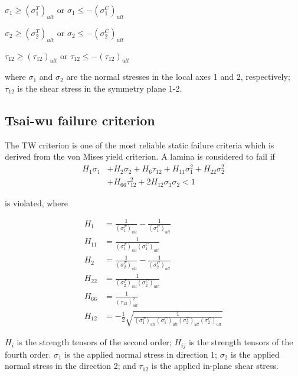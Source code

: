$\sigma_1 \geq (\sigma _1^{T})_{ult} $ or $\sigma_1 \leq -(\sigma _1^{C})_{ult} $

$\sigma_2 \geq (\sigma _2^{T})_{ult} $ or $\sigma_2 \leq -(\sigma _2^{C})_{ult} $

$\tau_{12} \geq (\tau_{12})_{ult} $  or $\tau_{12} \leq -(\tau_{12})_{ult} $

where $\sigma_1$ and $\sigma_2$ are the normal stresses in the local axes 1 and 2, respectively;
$\tau_{12}$ is the shear stress in the symmetry plane 1-2.

\subsection{Tsai-wu failure criterion}
The TW criterion is one of the most reliable static failure criteria which is derived from the von
Mises yield criterion.  
A lamina is considered to fail
if \begin{equation} \label{eq:tsai_wu}
\begin{split}
	H_1 \sigma_1  & + H_2 \sigma_2 + H_6 \tau_{12} + H_{11}\sigma_1^2 + H_{22} \sigma_2^2 \\
				  & + H_{66}  \tau_{12}^2 + 2H_{12}\sigma_1\sigma_2 < 1
\end{split}
\end{equation}

is violated, where

\begin{equation}
	\begin{split}
		H_{1}&=\frac{1}{\left(\sigma_{1}^{T}\right)_{u l t}}-\frac{1}{\left(\sigma_{1}^{C}\right)_{u l t}} \\
		H_{11}&=\frac{1}{\left(\sigma_{1}^{T}\right)_{u l t}\left(\sigma_{1}^{C}\right)_{u l t}} \\
		H_{2}&=\frac{1}{\left(\sigma_{2}^{T}\right)_{u l t}}-\frac{1}{\left(\sigma_{2}^{C}\right)_{u l t}} \\
		H_{22}&=\frac{1}{\left(\sigma_{2}^{T}\right)_{u l t}\left(\sigma_{2}^{C}\right)_{u l t}} \\
		H_{66}&=\frac{1}{\left(\tau_{12}\right)_{u l t}^{2}} \\
		H_{12}&=-\frac{1}{2} \sqrt{\frac{1}{\left(\sigma_{1}^{T}\right)_{u l
		t}\left(\sigma_{1}^{C}\right)_{u l t}\left(\sigma_{2}^{T}\right)_{u l
		t}\left(\sigma_{2}^{C}\right)_{u l t}}}
	\end{split}
\end{equation}

$H_i$ is the strength tensors of the second order; $H_{ij}$ is the strength
tensors of the fourth order. $\sigma_1$ is the applied normal stress in 
direction 1; $\sigma_2$ is the applied normal stress in the direction 2; and
$\tau_{12}$ is the applied in-plane shear stress.





